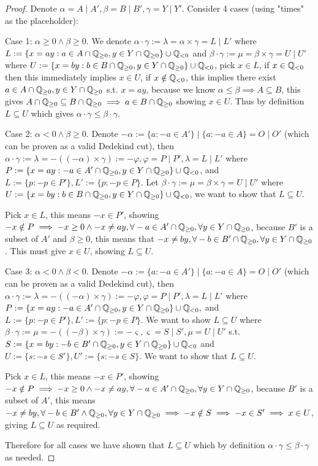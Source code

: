 \documentclass{homework}
\newcommand{\Q}{\bb{Q}} %
\newcommand{\?}{\stackrel{?}{=}}
\theoremstyle{definition}
\begin{document}
\begin{proof}
    Denote $\alpha=A\mid A', \beta= B\mid B', \gamma= Y\mid Y'$.  Consider 4 cases (using "times" as the placeholder):

    Case 1: $\alpha\geq0\land\beta\geq0$. We denote $\alpha\cdot \gamma:=\lambda=\alpha\times \gamma=L\mid L'$ where $L:=\{x=ay:a\in A\cap\Q_{\geq0},y\in Y\cap\Q_{\geq0}\}\cup\Q_{<0}$ and $\beta\cdot\gamma:=\mu=\beta\times\gamma=U\mid U'$ where $U:=\{x=by:b\in B\cap\Q_{\geq0},y\in Y\cap\Q_{\geq0}\}\cup\Q_{<0}$, pick $x\in L$, if $x\in\Q_{<0}$ then this immediately implies $x\in U$, if $x\notin\Q_{<0}$, this implies there exist $a\in A\cap\Q_{\geq0}, y\in Y\cap\Q_{\geq0}$ s.t. $x=ay$, because we know $\alpha\leq\beta\implies A\subseteq B$, this gives $A\cap\Q_{\geq0}\subseteq B\cap\Q_{\geq0}\implies a\in B\cap\Q_{\geq0}$ showing $x\in U$. Thus by definition $L\subseteq U$ which gives $\alpha\cdot\gamma\leq\beta\cdot\gamma$. 

    Case 2: $\alpha<0\land\beta\geq0$. Denote $-\alpha:=\{a:-a\in A'\}\mid \{a:-a\in A\}=O\mid O'$ (which can be proven as a valid Dedekind cut), then $\alpha\cdot\gamma:=\lambda=-((-\alpha)\times\gamma):=-\varphi, \varphi=P\mid P', \lambda=L\mid L'$ where $P:=\{x=ay:-a\in A'\cap\Q_{\geq0}, y\in Y\cap\Q_{\geq0}\}\cup \Q_{<0}$, and $L:=\{p:-p\in P'\}, L':=\{p:-p\in P\}$. Let $\beta\cdot\gamma:=\mu=\beta\times\gamma=U\mid U'$ where $U:=\{x=by:b\in B\cap\Q_{\geq0},y\in Y\cap\Q_{\geq0}\}\cup\Q_{<0}$, we want to show that $L\subseteq U$. 

    Pick $x\in L$, this means $-x\in P'$, showing $-x\notin P\implies -x\geq0\land -x\neq ay, \forall -a\in A'\cap\Q_{\geq0}, \forall y\in Y\cap\Q_{\geq0}$, because $B'$ is a subset of $A'$ and $\beta\geq0$, this means that $-x\neq by,\forall -b\in B'\cap\Q_{\geq0}, \forall y\in Y\cap\Q_{\geq0}$. This must give $x\in U$, showing $L\subseteq U$. 

    Case 3: $\alpha<0\land \beta<0$. Denote $-\alpha:=\{a:-a\in A'\}\mid \{a:-a\in A\}=O\mid O'$ (which can be proven as a valid Dedekind cut), then $\alpha\cdot\gamma:=\lambda=-((-\alpha)\times\gamma):=-\varphi, \varphi=P\mid P', \lambda=L\mid L'$ where $P:=\{x=ay:-a\in A'\cap\Q_{\geq0}, y\in Y\cap\Q_{\geq0}\}\cup \Q_{<0},$ and $L:=\{p:-p\in P'\}, L':=\{p:-p\in P\}$. We want to show $L\subseteq U$ where $\beta\cdot\gamma:=\mu=-((-\beta)\times\gamma):=-\varsigma, \varsigma=S\mid S', \mu=U\mid U'$ s.t.  $S:=\{x=by:-b\in B'\cap\Q_{\geq0}, y\in Y\cap\Q_{\geq0}\}\cup \Q_{<0}$ and $U:=\{s:-s\in S'\}, U':=\{s:-s\in S\}$. We want to show that $L\subseteq U$.

    Pick $x\in L$, this means $-x\in P'$, showing $-x\notin P\implies -x\geq0\land -x\neq ay, \forall -a\in A'\cap\Q_{\geq0}, \forall y\in Y\cap\Q_{\geq0}$, because $B'$ is a subset of $A'$, this means $-x\neq by,\forall -b\in B'\land\Q_{\geq0}, \forall y\in Y\cap\Q_{\geq0}\implies-x\notin S\implies -x\in S'\implies x\in U$, giving $L\subseteq U$ as required. 
    
    Therefore for all cases we have shown that $L\subseteq U$ which by definition $\alpha\cdot\gamma\leq\beta\cdot\gamma$ as needed. 
\end{proof}
\end{document}
